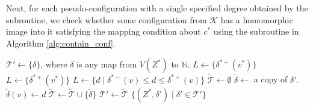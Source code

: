 \documentclass[main.tex]{subfiles}
\begin{document}
Next, for each pseudo-configuration with a single specified degree obtained by the \representativeDegree subroutine, we check whether some configuration from $\mathcal{K}$ has a homomorphic image into it satisfying the mapping condition about $c^*$ using the \containConf subroutine in Algorithm \ref{alg:contain_conf}.

\begin{algorithm}[H]
    \caption{\blockedByReducibleConfigurationWithLink($(Z^*, \delta^{*-}, \delta^{*+})$, $c^*$, $\mathcal{K}$)}
    \label{alg:block_by_reduc}
    \begin{algorithmic}[1]
                \State \Return \False
            \EndIf
        \EndFor
        \State \Return \True
    \end{algorithmic}
\end{algorithm}

\begin{algorithm}[H]
    \caption{\representativeDegreeWithLink($(Z^*, \delta^{*-}, \delta^{*+})$, $c^*$)}
    \label{alg:split}
    \begin{algorithmic}[1]
        \State $\mathcal{T}' \gets \{\delta\}$,
        where $\delta$ is any map from $V(Z^*)$ to $\mathbb{N}$.
                \State $L \gets \{\delta^{*+}(v^*)\}$
                \State $L \gets \{\delta^{*+}(v^*)\}$
            \Else
                \State $L \gets \{d \mid \delta^{*-}(v) \leq d \leq \delta^{*+}(v)\}$
            \EndIf
            \State $\tilde{\mathcal{T}} \gets \emptyset$
                    \State $\tilde{\delta} \gets$ a copy of $\delta'$.
                    \State $\tilde{\delta}(v) \gets d$
                    \State $\tilde{\mathcal{T}} \gets \tilde{\mathcal{T}} \cup \{ \tilde{\delta}\}$
                \EndFor
            \EndFor
            \State $\mathcal{T}' \gets \tilde{\mathcal{T}}$
        \EndFor
        \State \Return $\{(Z^*, \delta') \mid \delta' \in \mathcal{T}'\}$
    \end{algorithmic}
\end{algorithm}
\end{document}
